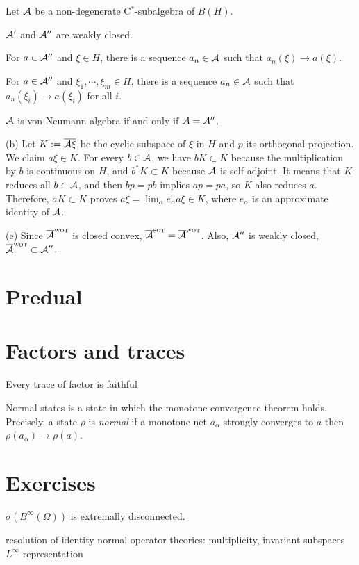 \documentclass{../../large}
\newcommand{\wot}{{\text{\sc wot}}}
\newcommand{\sot}{{\text{\sc sot}}}
\begin{document}
\begin{prb}
Let $\mathcal{A}$ be a non-degenerate C$^*$-subalgebra of $B(H)$.
\begin{parts}
\item $\mathcal{A}'$ and $\mathcal{A}''$ are weakly closed.
\item For $a\in\mathcal{A}''$ and $\xi\in H$, there is a sequence $a_n\in\mathcal{A}$ such that $a_n(\xi)\to a(\xi)$.
\item For $a\in\mathcal{A}''$ and $\xi_1,\cdots,\xi_m\in H$, there is a sequence $a_n\in\mathcal{A}$ such that $a_n(\xi_i)\to a(\xi_i)$ for all $i$.
\item $\mathcal{A}$ is von Neumann algebra if and only if $\mathcal{A}=\mathcal{A}''$.
\end{parts}
\end{prb}
\begin{pf}
(b)
Let $K:=\overline{\mathcal{A}\xi}$ be the cyclic subspace of $\xi$ in $H$ and $p$ its orthogonal projection.
We claim $a\xi\in K$.
For every $b\in\mathcal{A}$, we have $bK\subset K$ because the multiplication by $b$ is continuous on $H$, and $b^*K\subset K$ because $\mathcal{A}$ is self-adjoint.
It means that $K$ reduces all $b\in\mathcal{A}$, and then $bp=pb$ implies $ap=pa$, so $K$ also reduces $a$.
Therefore, $aK\subset K$ proves $a\xi=\lim_\alpha e_\alpha a\xi\in K$, where $e_\alpha$ is an approximate identity of $\mathcal{A}$.

(e)
Since $\bar\cA^\wot$ is closed convex, $\bar\cA^\sot=\bar\cA^\wot$.
Also, $\mathcal{A}''$ is weakly closed, $\bar\cA^\wot\subset\cA''$.
\end{pf}


\begin{prb}
\end{prb}



\section{Predual}



\section{Factors and traces}


Every trace of factor is faithful

\begin{prb}
Normal states is a state in which the monotone convergence theorem holds.
Precisely, a state $\rho$ is \emph{normal} if a monotone net $a_\alpha$ strongly converges to $a$ then $\rho(a_\alpha)\to\rho(a)$.
\end{prb}


\section*{Exercises}
\begin{prb}
$\sigma(B^\infty(\Omega))$ is extremally disconnected.
\end{prb}

resolution of identity
normal operator theories: multiplicity, invariant subspaces
$L^\infty$ representation
\end{document}
